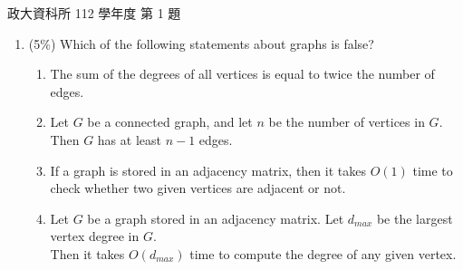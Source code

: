 \begin{pastexam}[label={px:nccu-112-dsa-01}]{政大資科所 112 學年度 第 1 題}
\begin{enumerate}[label=\arabic*),itemsep=2pt,topsep=2pt]
\item (5\%) Which of the following statements about graphs is false?
\begin{enumerate}[label=\Alph*.,itemsep=0pt,topsep=2pt]
\item The sum of the degrees of all vertices is equal to twice the number of edges.
\item Let $G$ be a connected graph, and let $n$ be the number of vertices in $G$.\\
Then $G$ has at least $n-1$ edges.
\item If a graph is stored in an adjacency matrix, then it takes $O(1)$ time to check whether two
given vertices are adjacent or not.
\item Let $G$ be a graph stored in an adjacency matrix. Let $d_{max}$ be the largest vertex degree
in $G$.\\
Then it takes $O(d_{max})$ time to compute the degree of any given vertex.
\end{enumerate}
\end{enumerate}
\end{pastexam}


